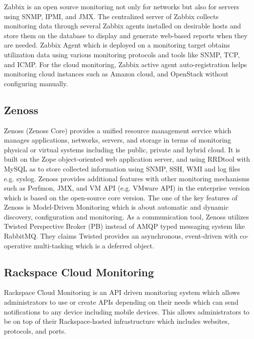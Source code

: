 \documentclass{sig-alternate}
\begin{document}
Zabbix is an open source monitoring not only for networks but also for servers using SNMP, IPMI, and JMX. The centralized server of Zabbix collects monitoring data through several Zabbix agents installed on desirable hosts and store them on the database to display and generate web-based reports when they are needed. Zabbix Agent which is deployed on a monitoring target obtains utilization data using various monitoring protocols and tools like SNMP, TCP, and ICMP. For the cloud monitoring, Zabbix active agent auto-registration helps monitoring cloud instances such as Amazon cloud, and OpenStack without configuring manually.

\subsection{Zenoss}

Zenoss (Zenoss Core) provides a unified resource management service which manages applications, networks, servers, and storage in terms of monitoring physical or virtual systems including the public, private and hybrid cloud. It is built on the Zope object-oriented web application server, and using RRDtool with MySQL as to store collected information using SNMP, SSH, WMI and log files e.g. syslog. Zenoss provides additional features with other monitoring mechanisms such as Perfmon, JMX, and VM API (e.g. VMware API) in the enterprise version which is based on the open-source core version. The one of the key features of Zenoss is Model-Driven Monitoring which is about automatic and dynamic discovery, configuration and monitoring. As a communication tool, Zenoss utilizes Twisted Perspective Broker (PB) instead of AMQP typed messaging system like RabbitMQ. They claims Twisted provides an asynchronous, event-driven with co-operative multi-tasking which is a deferred object.

\subsection{Rackspace Cloud Monitoring}

Rackspace Cloud Monitoring is an API driven monitoring system which allows administrators to use or create APIs depending on their needs which can send notifications to any device including mobile devices. This allows administrators to be on top of their Rackspace-hosted infrastructure which includes websites, protocols, and ports.

\fi
\end{document}
